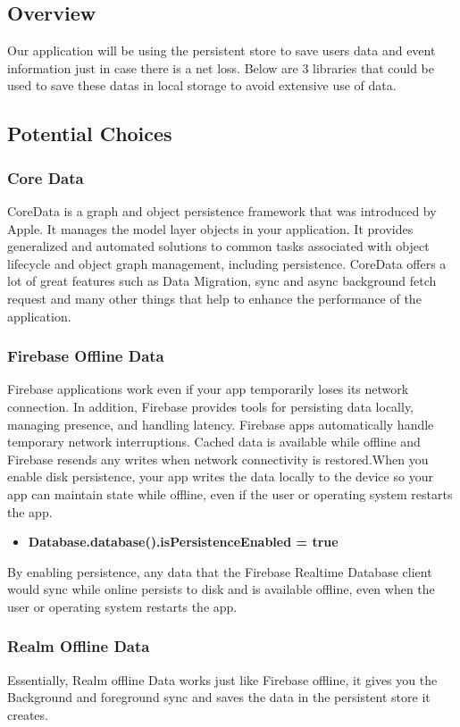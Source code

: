 \documentclass[onecolumn, draftclsnofoot,10pt, compsoc]{IEEEtran}
\begin{document}
\subsection{Overview}
Our application will be using the persistent store to save users data and event information just in case there is a net loss. Below are 3 libraries that could be used to save these datas in local storage to avoid extensive use of data.

\subsection{Potential Choices}
\subsubsection{Core Data\cite{CoreData}}
CoreData is a graph and object persistence framework that was introduced by Apple. It manages the model layer objects in your application. It provides generalized and automated solutions to common tasks associated with object lifecycle and object graph management, including persistence. CoreData offers a lot of great features such as Data Migration, sync and async background fetch request and many other things that help to enhance the performance of the application.

\subsubsection{Firebase Offline Data\cite{Firebase}}
Firebase applications work even if your app temporarily loses its network connection. In addition, Firebase provides tools for persisting data locally, managing presence, and handling latency. Firebase apps automatically handle temporary network interruptions. Cached data is available while offline and Firebase resends any writes when network connectivity is restored.When you enable disk persistence, your app writes the data locally to the device so your app can maintain state while offline, even if the user or operating system restarts the app.
\begin{itemize}
\item \textbf{Database.database().isPersistenceEnabled = true}
\end{itemize}
By enabling persistence, any data that the Firebase Realtime Database client would sync while online persists to disk and is available offline, even when the user or operating system restarts the app.

\subsubsection{Realm Offline Data\cite{Realm}}
Essentially, Realm offline Data works just like Firebase offline, it gives you the Background and foreground sync and saves the data in the persistent store it creates. 
\end{document}
